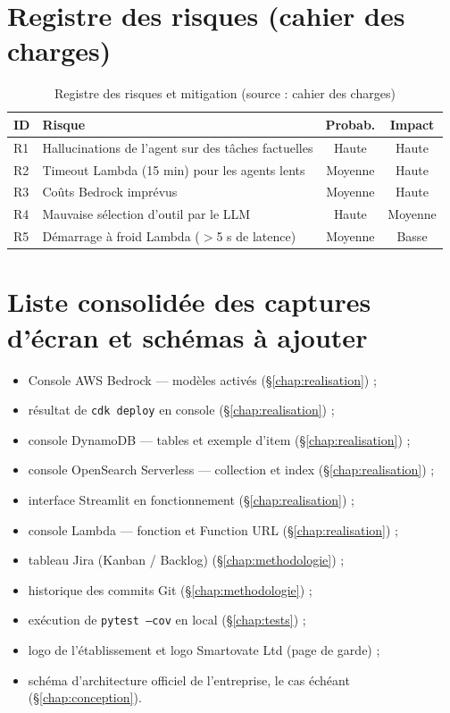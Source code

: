 \documentclass[11pt,a4paper]{report}
\begin{document}
\section{Registre des risques (cahier des charges)}

\begin{table}[H]
\centering
\small
\caption{Registre des risques et mitigation (source : cahier des charges)}
\begin{tabularx}{\linewidth}{@{}l Y c c@{}}
\toprule
\textbf{ID} & \textbf{Risque} & \textbf{Probab.} & \textbf{Impact} \\
\midrule
R1 & Hallucinations de l'agent sur des tâches factuelles & Haute & Haute \\
R2 & Timeout Lambda (15 min) pour les agents lents & Moyenne & Haute \\
R3 & Coûts Bedrock imprévus & Moyenne & Haute \\
R4 & Mauvaise sélection d'outil par le LLM & Haute & Moyenne \\
R5 & Démarrage à froid Lambda ($>$5 s de latence) & Moyenne & Basse \\
\bottomrule
\end{tabularx}
\end{table}

\section{Liste consolidée des captures d'écran et schémas à ajouter}

\begin{itemize}[nosep]
    \item Console AWS Bedrock — modèles activés (\S\ref{chap:realisation}) ;
    \item résultat de \texttt{cdk deploy} en console (\S\ref{chap:realisation}) ;
    \item console DynamoDB — tables et exemple d'item (\S\ref{chap:realisation}) ;
    \item console OpenSearch Serverless — collection et index (\S\ref{chap:realisation}) ;
    \item interface Streamlit en fonctionnement (\S\ref{chap:realisation}) ;
    \item console Lambda — fonction et Function URL (\S\ref{chap:realisation}) ;
    \item tableau Jira (Kanban / Backlog) (\S\ref{chap:methodologie}) ;
    \item historique des commits Git (\S\ref{chap:methodologie}) ;
    \item exécution de \texttt{pytest --cov} en local (\S\ref{chap:tests}) ;
    \item logo de l'établissement et logo Smartovate Ltd (page de garde) ;
    \item schéma d'architecture officiel de l'entreprise, le cas échéant (\S\ref{chap:conception}).
\end{itemize}
\end{document}
